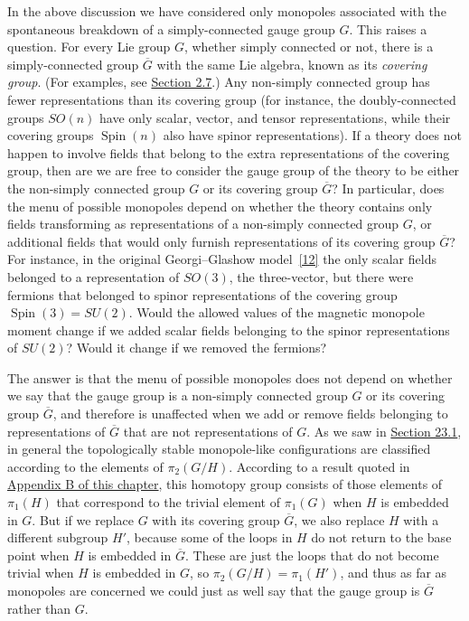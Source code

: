 In the above discussion we have considered only monopoles associated with
the spontaneous breakdown of a simply-connected gauge group $G$. This
raises a question. For every Lie group $G$, whether simply connected or
not, there is a simply-connected group $\overline G$ with the same Lie
algebra, known as its \emph{covering group}. (For examples, see
\hyperref[sec:2.7]{Section 2.7}.) Any non-simply connected group has fewer
representations than its covering group (for instance, the
doubly-connected groups $SO(n)$ have only scalar, vector, and tensor
representations, while their covering groups $\operatorname{Spin}(n)$ also
have spinor representations). If a theory does not happen to involve
fields that belong to the extra representations of the covering group,
then are we are free to consider the gauge group of the theory to be
either the non-simply connected group $G$ or its covering group
$\overline G$? In particular, does the menu of possible monopoles depend
on whether the theory contains only fields transforming as representations
of a non-simply connected group $G$, or additional fields that would only
furnish representations of its covering group $\overline G$? For instance,
in the original Georgi--Glashow model~\hyperref[ch23-ref-12]{[12]} the
only scalar fields belonged to a representation of $SO(3)$, the
three-vector, but there were fermions that belonged to spinor
representations of the covering group
$\operatorname{Spin}(3)=SU(2)$. Would the allowed values of the magnetic
monopole moment change if we added scalar fields belonging to the spinor
representations of $SU(2)$? Would it change if we removed the fermions?

The answer is that the menu of possible monopoles does not depend on
whether we say that the gauge group is a non-simply connected group $G$ or
its covering group $\overline G$, and therefore is unaffected when we add
or remove fields belonging to representations of $\overline G$ that are
not representations of $G$. As we saw in
\hyperref[sec:23.1]{Section 23.1}, in general the topologically stable
monopole-like configurations are classified according to the elements of
$\pi_2(G/H)$. According to a result quoted in
\hyperref[app:23.B]{Appendix B of this chapter}, this homotopy group
consists of those elements of $\pi_1(H)$ that correspond to the trivial
element of $\pi_1(G)$ when $H$ is embedded in $G$. But if we replace $G$
with its covering group $\overline G$, we also replace $H$ with a
different subgroup $H'$, because some of the loops in $H$ do not return to
the base point when $H$ is embedded in $\overline G$. These are just the
loops that do not become trivial when $H$ is embedded in $G$, so
$\pi_2(G/H)=\pi_1(H')$, and thus as far as monopoles are concerned we
could just as well say that the gauge group is $\overline G$ rather than
$G$.

